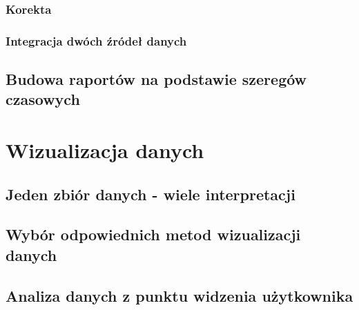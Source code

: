 \documentclass[brudnopis]{xmgr}
\begin{document}
        \subsection*{Korekta}

        \subsection*{Integracja dwóch źródeł danych}

     \section{Budowa raportów na podstawie szeregów czasowych}

\chapter{Wizualizacja danych}

     \section{Jeden zbiór danych - wiele interpretacji}

     \section{Wybór odpowiednich metod wizualizacji danych}

     \section{Analiza danych z punktu widzenia użytkownika}





\listoftables

\listoffigures

\oswiadczenie
\end{document}
